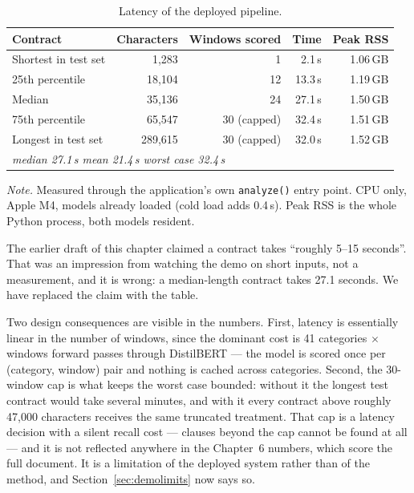 \begin{table}[ht]
\centering
\caption{Latency of the deployed pipeline.}
\label{tab:appbench}
\small
\begin{tabular}{lrrrr}
\toprule
\textbf{Contract} & \textbf{Characters} & \textbf{Windows scored} & \textbf{Time} & \textbf{Peak RSS}\\
\midrule
Shortest in test set & 1{,}283 & 1 & 2.1\,s & 1.06\,GB\\
25th percentile & 18{,}104 & 12 & 13.3\,s & 1.19\,GB\\
Median & 35{,}136 & 24 & 27.1\,s & 1.50\,GB\\
75th percentile & 65{,}547 & 30 (capped) & 32.4\,s & 1.51\,GB\\
Longest in test set & 289{,}615 & 30 (capped) & 32.0\,s & 1.52\,GB\\
\midrule
\multicolumn{3}{l}{\emph{median 27.1\,s \quad mean 21.4\,s \quad worst case 32.4\,s}} & & \\
\bottomrule
\end{tabular}

{\footnotesize\singlespacing \emph{Note.} Measured through the application's own \texttt{analyze()} entry point. CPU only, Apple M4, models already loaded (cold load adds 0.4\,s). Peak RSS is the whole Python process, both models resident.\par}
\end{table}

The earlier draft of this chapter claimed a contract takes ``roughly 5--15 seconds''. That was an impression from watching the demo on short inputs, not a measurement, and it is wrong: a median-length contract takes 27.1 seconds. We have replaced the claim with the table.

Two design consequences are visible in the numbers. First, latency is essentially linear in the number of windows, since the dominant cost is 41 categories $\times$ windows forward passes through DistilBERT --- the model is scored once per (category, window) pair and nothing is cached across categories. Second, the 30-window cap is what keeps the worst case bounded: without it the longest test contract would take several minutes, and with it every contract above roughly 47{,}000 characters receives the same truncated treatment. That cap is a latency decision with a silent recall cost --- clauses beyond the cap cannot be found at all --- and it is not reflected anywhere in the Chapter~6 numbers, which score the full document. It is a limitation of the deployed system rather than of the method, and Section~\ref{sec:demolimits} now says so.

